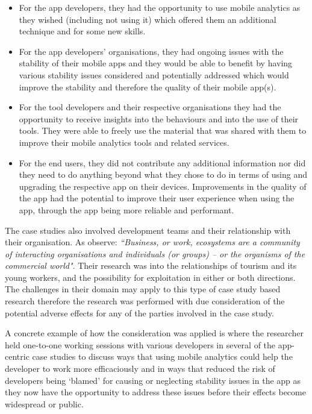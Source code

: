 \begin{itemize}
    \item For the app developers, they had the opportunity to use mobile analytics as they wished (including not using it) which offered them an additional technique and for some new skills.
    \item For the app developers' organisations, they had ongoing issues with the stability of their mobile apps and they would be able to benefit by having various stability issues considered and potentially addressed which would improve the stability and therefore the quality of their mobile app(s).
    \item For the tool developers and their respective organisations they had the opportunity to receive insights into the behaviours and into the use of their tools. They were able to freely use the material that was shared with them to improve their mobile analytics tools and related services.
    \item For the end users, they did not contribute any additional information nor did they need to do anything beyond what they chose to do in terms of using and upgrading the respective app on their devices. Improvements in the quality of the app had the potential to improve their user experience when using the app, through the app being more reliable and performant.
\end{itemize}

The case studies also involved development teams and their relationship with their organisation. 
As \citet[p.2]{robinson2019_applying_endosymbiosis_theory_tourism_and_its_young_workers} observe: \emph{``Business, or work, ecosystems are a community of interacting organisations and individuals (or groups) – or the organisms of the commercial world"}. Their research was into the relationships of tourism and its young workers, and the possibility for exploitation in either or both directions. The challenges in their domain may apply to this type of case study based research therefore the research was performed with due consideration of the potential adverse effects for any of the parties involved in the case study. 

A concrete example of how the consideration was applied is where the researcher held one-to-one working sessions with various developers in several of the app-centric case studies to discuss ways that using mobile analytics could help the developer to work more efficaciously and in ways that reduced the risk of developers being `blamed' for causing or neglecting stability issues in the app as they now have the opportunity to address these issues before their effects become widespread or public.

